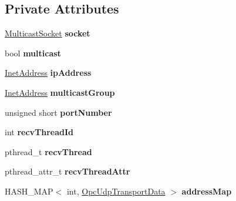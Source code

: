 \subsection*{\-Private \-Attributes}
\begin{DoxyCompactItemize}
\item 
\hypertarget{class_jaus_opc_udp_interface_af14f53e808a43a7b58aebf9a7ff4c3c7}{\hyperlink{struct_multicast_socket_struct}{\-Multicast\-Socket} {\bfseries socket}}\label{class_jaus_opc_udp_interface_af14f53e808a43a7b58aebf9a7ff4c3c7}

\item 
\hypertarget{class_jaus_opc_udp_interface_a4542dc61badff4a47edeed169fedc5ed}{bool {\bfseries multicast}}\label{class_jaus_opc_udp_interface_a4542dc61badff4a47edeed169fedc5ed}

\item 
\hypertarget{class_jaus_opc_udp_interface_a9c53f46d215cf552070ae3c3ac617428}{\hyperlink{struct_inet_address_struct}{\-Inet\-Address} {\bfseries ip\-Address}}\label{class_jaus_opc_udp_interface_a9c53f46d215cf552070ae3c3ac617428}

\item 
\hypertarget{class_jaus_opc_udp_interface_a7457ba471ac0fdf5e1d309d315e5dfd4}{\hyperlink{struct_inet_address_struct}{\-Inet\-Address} {\bfseries multicast\-Group}}\label{class_jaus_opc_udp_interface_a7457ba471ac0fdf5e1d309d315e5dfd4}

\item 
\hypertarget{class_jaus_opc_udp_interface_a5962bd49dd30aa08ef33270e54906f61}{unsigned short {\bfseries port\-Number}}\label{class_jaus_opc_udp_interface_a5962bd49dd30aa08ef33270e54906f61}

\item 
\hypertarget{class_jaus_opc_udp_interface_a9ba82c38ab270fba3e189fd009ad3f85}{int {\bfseries recv\-Thread\-Id}}\label{class_jaus_opc_udp_interface_a9ba82c38ab270fba3e189fd009ad3f85}

\item 
\hypertarget{class_jaus_opc_udp_interface_a873479d2a3531f48ff5690dd52db9a56}{pthread\-\_\-t {\bfseries recv\-Thread}}\label{class_jaus_opc_udp_interface_a873479d2a3531f48ff5690dd52db9a56}

\item 
\hypertarget{class_jaus_opc_udp_interface_a24bd6ebed02ba623ce0ba426e5064815}{pthread\-\_\-attr\-\_\-t {\bfseries recv\-Thread\-Attr}}\label{class_jaus_opc_udp_interface_a24bd6ebed02ba623ce0ba426e5064815}

\item 
\hypertarget{class_jaus_opc_udp_interface_a8e3f2acbeb56b119a0269e1050c7b61f}{\-H\-A\-S\-H\-\_\-\-M\-A\-P$<$ int, \*
\hyperlink{struct_opc_udp_transport_data}{\-Opc\-Udp\-Transport\-Data} $>$ {\bfseries address\-Map}}\label{class_jaus_opc_udp_interface_a8e3f2acbeb56b119a0269e1050c7b61f}


\end{DoxyCompactItemize}
